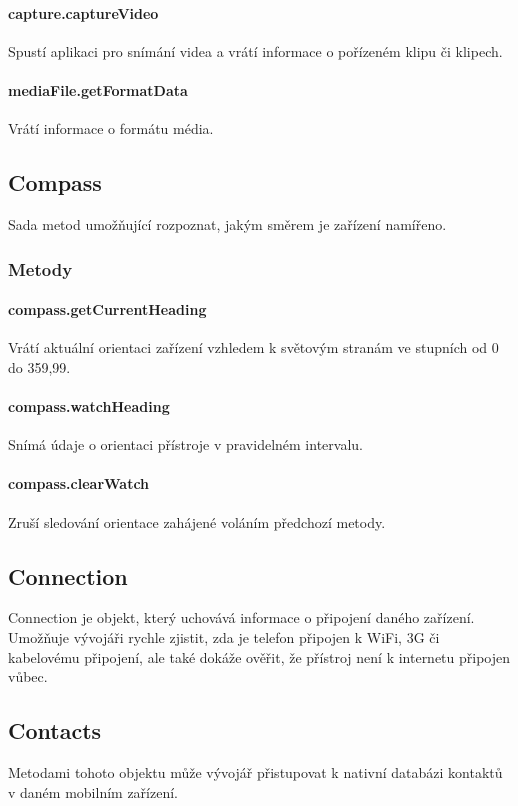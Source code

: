\paragraph{capture.captureVideo}
Spustí aplikaci pro snímání videa a vrátí informace o pořízeném klipu či klipech.

\paragraph{mediaFile.getFormatData}
Vrátí informace o formátu média.

\subsection{Compass}
Sada metod umožňující rozpoznat, jakým směrem je zařízení namířeno.

\subsubsection{Metody}
\paragraph{compass.getCurrentHeading}
Vrátí aktuální orientaci zařízení vzhledem k světovým stranám ve stupních od 0 do 359,99.

\paragraph{compass.watchHeading}
Snímá údaje o orientaci přístroje v pravidelném intervalu.

\paragraph{compass.clearWatch}
Zruší sledování orientace zahájené voláním předchozí metody.

\subsection{Connection}
Connection je objekt, který uchovává informace o připojení daného zařízení. Umožňuje vývojáři rychle zjistit, zda je telefon připojen k WiFi, 3G či kabelovému připojení, ale také dokáže ověřit, že přístroj není k internetu připojen vůbec.

\subsection{Contacts}
Metodami tohoto objektu může vývojář přistupovat k nativní databázi kontaktů v daném mobilním zařízení.

